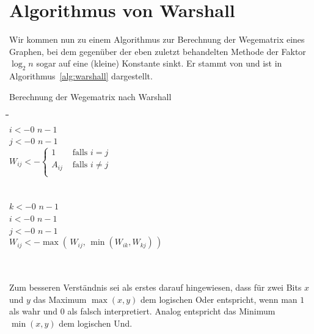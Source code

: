\Tut\section{Algorithmus von Warshall}
\label{sec:warshall}

 Wir
kommen nun zu einem Algorithmus zur Berechnung der Wegematrix eines
Graphen, bei dem gegenüber der eben zuletzt behandelten Methode der
Faktor $\log_2 n$ sogar auf eine (kleine) Konstante sinkt. Er stammt
von \textcite{Warshall_1962_TBM_ar} und ist in
Algorithmus~\ref{alg:warshall} dargestellt.

\begin{algorithm}[h]
  \caption{Berechnung der Wegematrix nach Warshall}
  \label{alg:warshall}
  \vspace*{-\baselineskip}
  \begin{tabbing}
    \quad\=\quad\=\quad\=\quad\=\quad\=\hspace*{30mm}\=\\ \kill
    \> $i <- 0$  $n-1$ \\
    \>\> $j <- 0$  $n-1$ \\
    \>\>\> $W_{ij} <- \begin{cases}
      1 & \text{ falls } i=j\\
      A_{ij} & \text{ falls } i\not=j\\
    \end{cases}$ \\
    \>\> \\
    \> \\
    \> $k <- 0$  $n-1$ \\
    \>\> $i <- 0$  $n-1$ \\
    \>\>\> $j <- 0$  $n-1$ \\
    \>\>\>\> $W_{ij} <- \max(\, W_{ij} ,\,  \min(W_{ik}, W_{kj})\,  )$\\
    \>\>\> \\
    \>\> \\
    \>
  \end{tabbing}
\end{algorithm}
 
\noindent
Zum besseren Verständnis sei als erstes darauf hingewiesen, dass für
zwei Bits $x$ und $y$ das Maximum $\max(x,y)$ dem logischen Oder
entspricht, wenn man $1$ als wahr und $0$ als falsch
interpretiert. Analog entspricht das Minimum $\min(x,y)$ dem logischen
Und.

